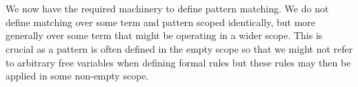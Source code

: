 {\begin{code}
\AgdaSpace{}%
\AgdaSpace{}%
\AgdaSpace{}%
\AgdaSpace{}%
\AgdaSpace{}%
\<%
\\
\>[0]\AgdaSpace{}%
\AgdaSymbol{|}\AgdaSpace{}%
\AgdaSpace{}%
\AgdaSpace{}%
\AgdaSymbol{=}\AgdaSpace{}%
\AgdaSpace{}%
\AgdaSpace{}%
\AgdaSpace{}%
\AgdaSpace{}%
\AgdaSpace{}%
\<%
\\
\>[0]\AgdaSpace{}%
\AgdaSymbol{|}\AgdaSpace{}%
\AgdaSpace{}%
\AgdaSpace{}%
\AgdaSymbol{=}\AgdaSpace{}%
\AgdaSpace{}%
\<%
\end{code}
}
We now have the required machinery to define pattern matching. We do not
define matching over some term and pattern scoped identically, but more 
generally over some term that might be operating in a wider scope. This
is crucial as a pattern is often defined in the empty scope so that we might
not refer to arbitrary free variables when defining formal rules but these rules
may then be applied in some non-empty scope. 
